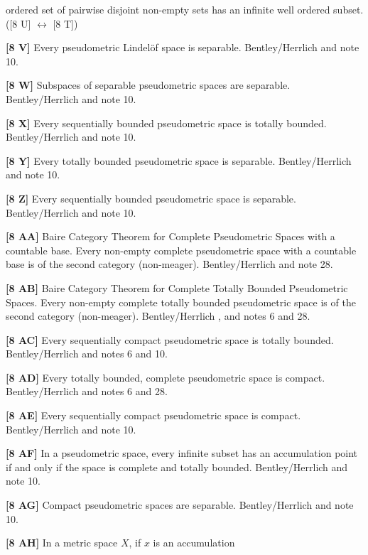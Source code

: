 ordered set of pairwise disjoint non-empty sets has an infinite well
ordered subset. ([8 U] $\leftrightarrow$ [8 T])
\smallskip
\item{}{\bf [8 V]} Every pseudometric Lindel\"of space is separable.
\ac{Bentley/Herrlich} \cite{1998} and note 10.
\smallskip
\item{}{\bf [8 W]} Subspaces of separable pseudometric spaces are separable.
\ac{Bentley/Herrlich} \cite{1998} and note 10.
\smallskip
\item{}{\bf [8 X]} Every sequentially bounded pseudometric space is
totally bounded. \ac{Bentley/Herrlich} \cite{1998} and note 10.
\smallskip
\item{}{\bf [8 Y]} Every totally bounded pseudometric space is
separable.  \ac{Bentley/Herrlich} \cite{1998} and note 10.
\smallskip
\item{}{\bf [8 Z]} Every sequentially bounded pseudometric space is
separable.  \ac{Bentley/Herrlich} \cite{1998} and note 10.
\smallskip
\item{}{\bf [8 AA]} Baire Category Theorem for Complete Pseudometric
Spaces with a countable base.  Every non-empty complete pseudometric
space with a countable base is of the second category (non-meager).
\ac{Bentley/Herrlich} \cite{1998} and note 28.
\smallskip
\item{}{\bf [8 AB]} Baire Category Theorem for Complete Totally
Bounded Pseudometric Spaces.  Every non-empty complete totally bounded
pseudometric space is of the second category (non-meager).
\ac{Bentley/Herrlich} \cite{1998}, and notes 6 and 28.
\smallskip
\item{}{\bf [8 AC]} Every sequentially compact pseudometric space is
totally bounded. \ac{Bentley/Herrlich} \cite{1998} and notes 6 and 10.
\smallskip
\item{}{\bf [8 AD]} Every totally bounded, complete pseudometric space
is compact.  \ac{Bentley/Herrlich} \cite{1998} and notes 6 and 28.
\smallskip
\item{}{\bf [8 AE]} Every sequentially compact pseudometric space is
compact.  \ac{Bentley/Herrlich} \cite{1998} and note 10.
\smallskip
\item{}{\bf [8 AF]} In a pseudometric space, every infinite subset has
an accumulation point if and only if the space is complete and totally
bounded.  \ac{Bentley/Herrlich} \cite{1998} and note 10.
\smallskip
\item{}{\bf [8 AG]} Compact pseudometric spaces are separable.
\ac{Bentley/Herrlich} \cite{1998} and note 10.
\smallskip
\item{}{\bf [8 AH]} In a metric space $X$, if $x$ is an accumulation
